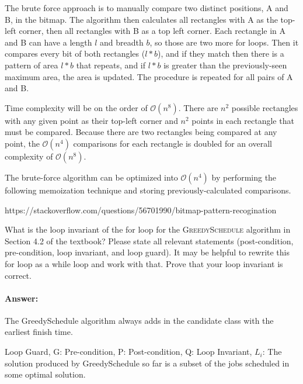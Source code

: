 \documentclass{article}
\begin{document}
The brute force approach is to manually compare two distinct positions, A and B, in the bitmap. The algorithm then calculates all rectangles with A as the top-left corner, then all rectangles with B as a top left corner. Each rectangle in A and B can have a length $l$ and breadth $b$, so those are two more for loops. Then it compares every bit of both rectangles ($l * b$), and if they match then there is a pattern of area $l*b$ that repeats, and if $l*b$ is greater than the previously-seen maximum area, the area is updated. The procedure is repeated for all pairs of A and B. 

Time complexity will be on the order of $\mathcal{O}(n^8)$. There are $n^2$ possible rectangles with any given point as their top-left corner and $n^2$ points in each rectangle that must be compared. Because there are two rectangles being compared at any point, the $\mathcal{O}(n^4)$ comparisons for each rectangle is doubled for an overall complexity of $\mathcal{O}(n^8).$

The brute-force algorithm can be optimized into $\mathcal{O}(n^4)$ by performing the following memoization technique and storing previously-calculated comparisons. 

https://stackoverflow.com/questions/56701990/bitmap-pattern-recogination


\collab{\todo{}}

What is the loop invariant of the for loop for the \textsc{GreedySchedule}
algorithm in Section 4.2 of the textbook?  Please state all relevant statements
(post-condition, pre-condition, loop invariant, and loop guard).  It may be
helpful to rewrite this for loop as a while loop and work with that.  Prove that
your loop invariant is correct.

\paragraph{Answer: }

The GreedySchedule algorithm always adds in the candidate class with the earliest finish time.

Loop Guard, G:
Pre-condition, P: 
Post-condition, Q: 
Loop Invariant, $L_i$: The solution produced by GreedySchedule so far is a subset of the jobs scheduled in some optimal solution.
\end{document}
